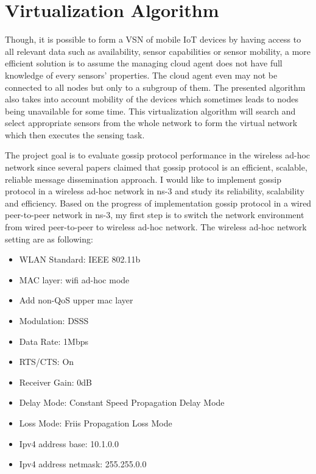 \section{Virtualization Algorithm}
Though, it is possible to form a VSN of mobile IoT devices by having access to all relevant data such as availability, sensor capabilities or sensor mobility, a more efficient solution is to assume the managing cloud agent does not have full knowledge of every sensors’ properties. \cite{Sherif} The cloud agent even may not be connected to all nodes but only to a subgroup of them. The presented algorithm also takes into account mobility of the devices which sometimes leads to nodes being unavailable for some time. \cite{Sherif}
This virtualization algorithm will search and select appropriate sensors from the whole network to form the virtual network which then executes the sensing task.








The project goal is to evaluate gossip protocol performance in the wireless ad-hoc network since several papers\cite{gossip}\cite{gossip2} claimed that gossip protocol is an efficient, scalable, reliable message dissemination approach. I would like to implement gossip protocol in a wireless ad-hoc network in ns-3 and study its reliability, scalability and efficiency. Based on the progress of implementation gossip protocol in a wired peer-to-peer network in ns-3, my first step is to switch the network environment from wired peer-to-peer to wireless ad-hoc network. The wireless ad-hoc network setting are as following:

\begin{itemize}
	\item WLAN Standard: IEEE 802.11b
	\item MAC layer: wifi ad-hoc mode
	\item Add non-QoS upper mac layer
	\item Modulation: DSSS
	\item Data Rate: 1Mbps
	\item RTS/CTS: On
	\item Receiver Gain: 0dB
	\item Delay Mode: Constant Speed Propagation Delay Mode
	\item Loss Mode: Friis Propagation Loss Mode
	\item Ipv4 address base: 10.1.0.0
	\item Ipv4 address netmask: 255.255.0.0
\end{itemize}

